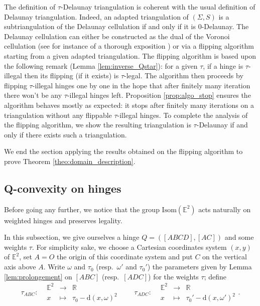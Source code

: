 \documentclass[a4paper,12pt]{article}
\def\isom{Isom}
\def\E{\mathbf E}
\def\d{\mathrm{d}}
\def\E{\mathbb{E}}
\def\RR{\mathbb{R}}
\def\isom{\mathrm{Isom}}
\def\E{\mathbb{E}}
\def\isom{\mathrm{Isom}}
\def\d{\mathrm{d}}
\newcommand{\function}[5]{\displaystyle#1:\begin{array}{l|rcl}
& \displaystyle #2 & \longrightarrow & \displaystyle #3 \\
	& \displaystyle #4 & \longmapsto & \displaystyle #5 \end{array}}
\theoremstyle{definition}
\begin{document}
					The definition of $\tau$-Delaunay triangulation is coherent with the usual definition of Delaunay triangulation. Indeed, an adapted triangulation of $(\Sigma, S)$ is a subtriangulation of the Delaunay cellulation if and only if it is $0$-Delaunay. 
					The Delaunay cellulation can either be constructed as the dual of the Voronoi cellulation (see for instance of a thorough exposition \cite{MR1135877}) or via a flipping algorithm starting from a given adapted triangulation. The flipping algorithm is based upon the following remark (Lemma \ref{lem:inverse_Qstar}): for a given $\tau$, if a hinge is $\tau$-illegal then its flipping (if it exists) is $\tau$-legal. The algorithm then proceeds by flipping $\tau$-illegal hinges one by one in the hope that after finitely many iteration there won't be any $\tau$-illegal hinges left. Proposition \ref{prop:algo_stop} ensures the algorithm behaves mostly as expected: it stops after finitely many iterations on a triangulation without any flippable $\tau$-illegal hinges. To complete the analysis of the flipping algorithm, we show the resulting triangulation is $\tau$-Delaunay if and only if there exists such a triangulation. 
					
					We end the section applying the results obtained on the flipping algorithm to prove Theorem \ref{theo:domain_description}.







					\subsection{Q-convexity on hinges}\label{subsec:Qconvexhinge}


						Before going any further, we notice that the group $\isom(\E^2)$ acts naturally on weighted hinges and preserves legality.

						\label{sec:critere_Qconvexe}

						 In this subsection, we give ourselves a hinge
						 $Q=([ABCD],[AC])$ and some weights $\tau$. For simplicity sake, we choose a Cartesian coordinates system $(x,y)$ of $\E^2$, set $A=O$ the origin of this coordinate system and put $C$ on the vertical axis above $A$. Write $\omega$ and $\tau_0$ (resp.\ $\omega'$ and $\tau_0'$) the parameters given 
						 by Lemma \ref{lem:prolongement} on $[ABC]$ (resp.\ $[ADC]$) for the weights $\tau$;
						 define $$\function{\tau_{ABC}}{\E^2}{\RR}{x}{\tau_0-\d(x,\omega)^2} \quad \quad \function{\tau_{ADC}}{\E^2}{\RR}{x}{\tau_0'-\d(x,\omega')^2}.$$
						 
\end{document}

